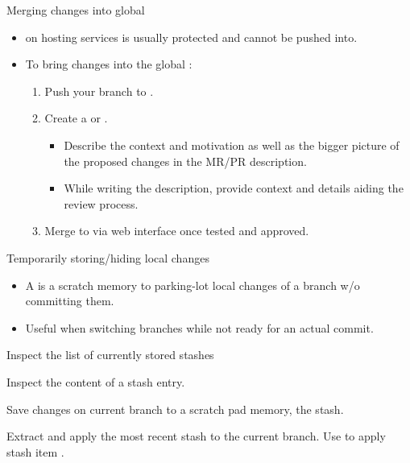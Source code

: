 \begin{frame}{Merging changes into global }
\begin{itemize}
\item {} on hosting services is usually protected and cannot be pushed into.
\item To bring changes into the global :
\begin{enumerate}
\item Push your branch to .
\item Create a  or .
\begin{itemize}
\item Describe the context and motivation as well as the bigger picture of the proposed changes in the MR/PR description.
\item While writing the description, provide context and details aiding the review process.
\end{itemize}
\item Merge to  via web interface once tested and approved.
\end{enumerate}
\end{itemize}
\end{frame}

\begin{frame}{Temporarily storing/hiding local changes}

\begin{itemize}
\item A  is a scratch memory to parking-lot local changes of a branch w/o committing them.
\item Useful when switching branches while not ready for an actual commit.
\end{itemize}
\begin{block}{}
Inspect the list of currently stored stashes
\end{block}
\begin{block}{}
Inspect the content of a stash entry.
\end{block}
\begin{block}{}
Save changes on current branch to a scratch pad memory, {\ie} the stash.
\end{block}
\begin{block}{}
Extract and apply the most recent stash to the current branch.
Use  to apply stash item .
\end{block}
\end{frame}

